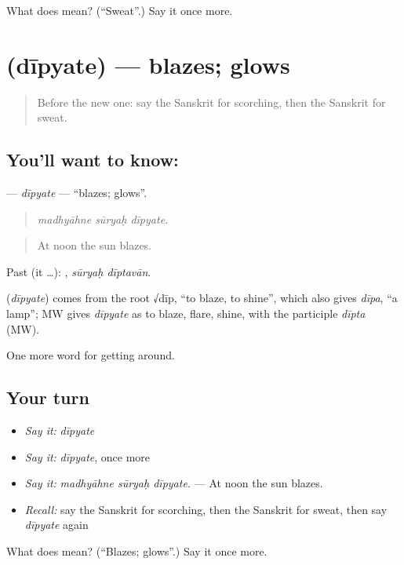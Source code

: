 \begin{tcolorbox}[breakable,colback=teal!4,colframe=teal!35!black,title={Before you move on}]
What does  mean? (\textquotedblleft{}Sweat\textquotedblright{}.) Say it once more.
\end{tcolorbox}
\section[\texorpdfstring{\sk{दीप्यते} (dīpyate)}{दीप्यते (dīpyate)}]{ (dīpyate) — blazes; glows}

\label{lesson:SA-C438-dipyate}



\begin{quote}
Before the new one: say the Sanskrit for scorching, then the Sanskrit for sweat.
\end{quote}

\subsection*{You'll want to know: }
\textbf{} — \emph{dīpyate} — \textquotedblleft{}blazes; glows\textquotedblright{}.

\begin{quote}
  
\end{quote}

\begin{quote}
\emph{madhyāhne sūryaḥ dīpyate.}
\end{quote}

\begin{quote}
At noon the sun blazes.
\end{quote}

Past (it …):  , \emph{sūryaḥ dīptavān}.

\begin{cousinweb}
\textbf{} (\emph{dīpyate}) comes from the root √dīp, \textquotedblleft{}to blaze, to shine\textquotedblright{}, which also gives \emph{dīpa}, \textquotedblleft{}a lamp\textquotedblright{}; MW gives \emph{dīpyate} as to blaze, flare, shine, with the participle \emph{dīpta} (MW).
\end{cousinweb}

\begin{grammarlens}[title={What you've built}]
One more word for getting around.
\end{grammarlens}

\subsection*{Your turn}
\begin{itemize}
\raggedright
  \item \emph{Say it:} \emph{dīpyate}
  \item \emph{Say it:} \emph{dīpyate}, once more
  \item \emph{Say it:} \emph{madhyāhne sūryaḥ dīpyate.} — At noon the sun blazes.
  \item \emph{Recall:} say the Sanskrit for scorching, then the Sanskrit for sweat, then say \emph{dīpyate} again
\end{itemize}

\begin{tcolorbox}[breakable,colback=teal!4,colframe=teal!35!black,title={Before you move on}]
What does  mean? (\textquotedblleft{}Blazes; glows\textquotedblright{}.) Say it once more.
\end{tcolorbox}
